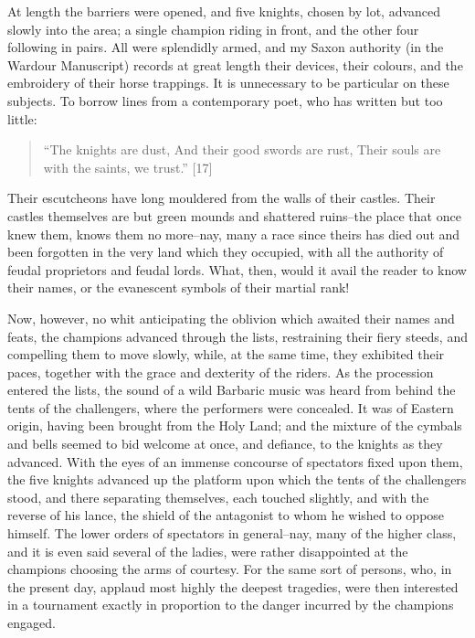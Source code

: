 At length the barriers were opened, and five knights, chosen by lot,
advanced slowly into the area; a single champion riding in front, and
the other four following in pairs. All were splendidly armed, and my
Saxon authority (in the Wardour Manuscript) records at great length
their devices, their colours, and the embroidery of their horse
trappings. It is unnecessary to be particular on these subjects. To
borrow lines from a contemporary poet, who has written but too little:

\begin{quote}
``The knights are dust,
And their good swords are rust,
Their souls are with the saints, we trust.'' [17]
\end{quote}

Their escutcheons have long mouldered from the walls of their castles.
Their castles themselves are but green mounds and shattered ruins--the
place that once knew them, knows them no more--nay, many a race since
theirs has died out and been forgotten in the very land which they
occupied, with all the authority of feudal proprietors and feudal lords.
What, then, would it avail the reader to know their names, or the
evanescent symbols of their martial rank!

Now, however, no whit anticipating the oblivion which awaited their
names and feats, the champions advanced through the lists, restraining
their fiery steeds, and compelling them to move slowly, while, at the
same time, they exhibited their paces, together with the grace and
dexterity of the riders. As the procession entered the lists, the sound
of a wild Barbaric music was heard from behind the tents of the
challengers, where the performers were concealed. It was of Eastern
origin, having been brought from the Holy Land; and the mixture of the
cymbals and bells seemed to bid welcome at once, and defiance, to the
knights as they advanced. With the eyes of an immense concourse of
spectators fixed upon them, the five knights advanced up the platform
upon which the tents of the challengers stood, and there separating
themselves, each touched slightly, and with the reverse of his lance,
the shield of the antagonist to whom he wished to oppose himself. The
lower orders of spectators in general--nay, many of the higher class,
and it is even said several of the ladies, were rather disappointed at
the champions choosing the arms of courtesy. For the same sort of
persons, who, in the present day, applaud most highly the deepest
tragedies, were then interested in a tournament exactly in proportion to
the danger incurred by the champions engaged.

